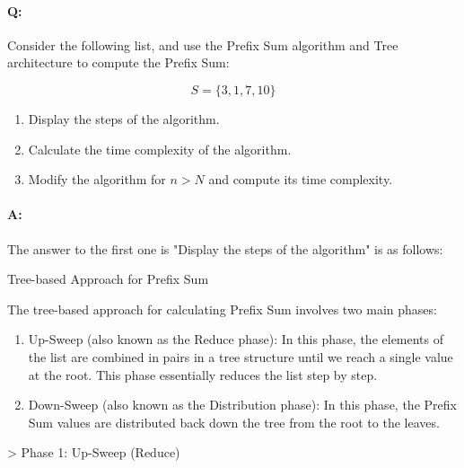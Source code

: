 \documentclass[a4paper,10pt]{article}
\begin{document}

    \paragraph{\bold Q:} Consider the following list, and use the Prefix Sum algorithm and Tree architecture to compute the Prefix Sum:

    $$S= \{3, 1, 7, 10\}$$

    \begin{enumerate}

        \item Display the steps of the algorithm.

        \item Calculate the time complexity of the algorithm.

        \item Modify the algorithm for $n > N$ and compute its time complexity.

    \end{enumerate}
    

    \paragraph{\bold A:} The answer to the first one is "Display the steps of the algorithm" is as follows:
        
        {\bold Tree-based Approach for Prefix Sum}

        The tree-based approach for calculating Prefix Sum involves two main phases:

        \begin{enumerate}
            
            \item {\bold Up-Sweep (also known as the Reduce phase):} In this phase, the elements of the list are combined in pairs in a tree structure until we reach a single value at the root. This phase essentially reduces the list step by step.

            \item {\bold Down-Sweep (also known as the Distribution phase):} In this phase, the Prefix Sum values are distributed back down the tree from the root to the leaves.

        \end{enumerate}

        \noindent
        {\bold > \hspace{10pt} Phase 1: Up-Sweep (Reduce)}
\end{document}
